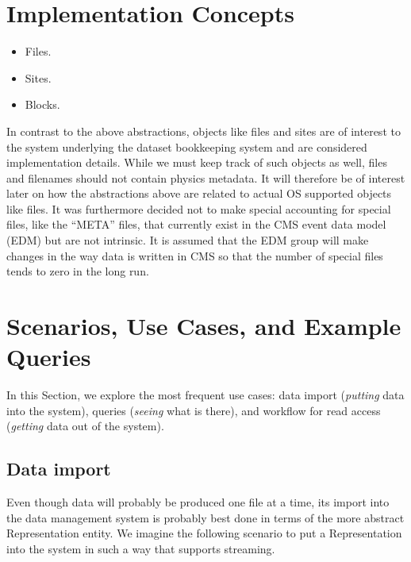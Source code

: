 \documentclass{cmspaper}
\begin{document}
\section{Implementation Concepts}

\begin{itemize}
\item Files.
\item Sites.
\item Blocks.
\end{itemize}

In contrast to the above abstractions, objects like files and sites are 
of interest to the system underlying the dataset bookkeeping system and are considered 
implementation details.  While we must keep track of such objects as well, 
files and filenames should not contain physics metadata.  It will therefore
be of interest later on how the abstractions above are related to actual OS 
supported objects like files.  It was furthermore decided not to make special 
accounting for special files, like the ``META'' files, that currently exist in the 
CMS event data model (EDM) but are not intrinsic.  It is assumed that the EDM group will 
make changes in the way data is written in CMS so that the number of special files tends 
to zero in the long run.  


\section{Scenarios, Use Cases, and Example Queries}

In this Section, we explore the most frequent use cases: data import
({\em putting} data into the system), queries ({\em seeing} what is there),
and workflow for read access ({\em getting} data out of the system).

\subsection{Data import}

Even though data will probably be produced one file at a time, its import  
into the data management system is probably best done in terms of the 
more abstract Representation entity. We imagine the 
following scenario to put  a Representation 
into the system in such a way that supports streaming.
\end{document}
